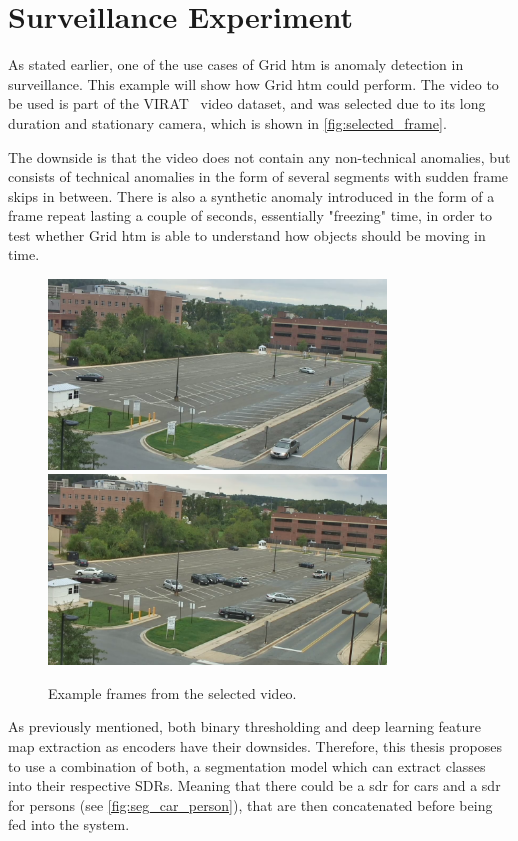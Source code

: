 \section{Surveillance Experiment}
As stated earlier, one of the use cases of Grid \gls*{htm} is anomaly detection in surveillance. This example will show how Grid \gls*{htm} could perform.
The video to be used is part of the VIRAT~\cite{VIRAT} video dataset, and was selected due to its long duration and stationary camera, which is shown in \autoref{fig:selected_frame}.
\par
The downside is that the video does not contain any non-technical anomalies, but consists of technical anomalies in the form of several segments with sudden frame skips in between. There is also a synthetic anomaly introduced in the form of a frame repeat lasting a couple of seconds, essentially "freezing" time, in order to test whether Grid \gls*{htm} is able to understand how objects should be moving in time.
\begin{figure}[H]
    \centering
    \includegraphics[width=0.8\textwidth]{resources/methodology/original.png}
    \includegraphics[width=0.8\textwidth]{resources/experiments/surveillance/parking_frame.png}
    \caption[Example Frames]{Example frames from the selected video.}
    \label{fig:selected_frame}
\end{figure}
As previously mentioned, both binary thresholding and deep learning feature map extraction as encoders have their downsides. Therefore, this thesis proposes to use a combination of both, a segmentation model which can extract classes into their respective SDRs. Meaning that there could be a \gls*{sdr} for cars and a \gls*{sdr} for persons (see \autoref{fig:seg_car_person}), that are then concatenated before being fed into the system.
